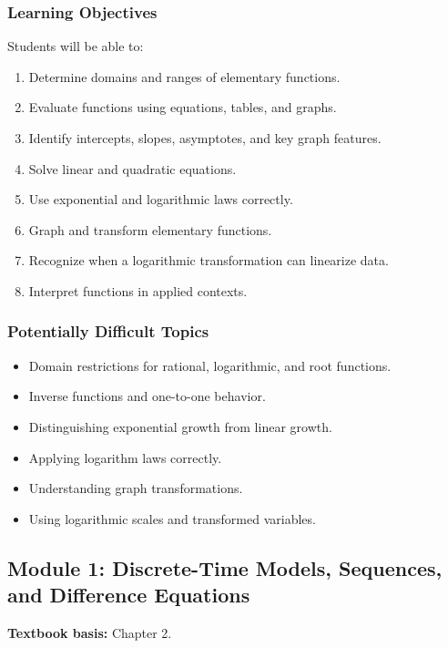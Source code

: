 \documentclass[11pt]{article}
\begin{document}
\subsubsection*{Learning Objectives}

Students will be able to:

\begin{enumerate}[label=\arabic*.]
    \item Determine domains and ranges of elementary functions.
    \item Evaluate functions using equations, tables, and graphs.
    \item Identify intercepts, slopes, asymptotes, and key graph features.
    \item Solve linear and quadratic equations.
    \item Use exponential and logarithmic laws correctly.
    \item Graph and transform elementary functions.
    \item Recognize when a logarithmic transformation can linearize data.
    \item Interpret functions in applied contexts.
\end{enumerate}

\subsubsection*{Potentially Difficult Topics}

\begin{itemize}
    \item Domain restrictions for rational, logarithmic, and root functions.
    \item Inverse functions and one-to-one behavior.
    \item Distinguishing exponential growth from linear growth.
    \item Applying logarithm laws correctly.
    \item Understanding graph transformations.
    \item Using logarithmic scales and transformed variables.
\end{itemize}

\subsection{Module 1: Discrete-Time Models, Sequences, and Difference Equations}

\textbf{Textbook basis:} Chapter 2.
\end{document}
